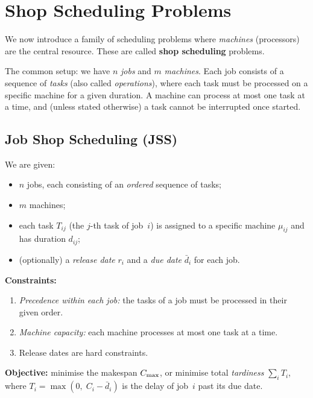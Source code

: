 \section{Shop Scheduling Problems}
\label{sec:shop-scheduling}

We now introduce a family of scheduling problems where
\emph{machines} (processors) are the central resource.
These are called \textbf{shop scheduling} problems.%

The common setup: we have $n$ \emph{jobs} and $m$
\emph{machines}.  Each job consists of a sequence of
\emph{tasks} (also called \emph{operations}), where each task
must be processed on a specific machine for a given duration.
A machine can process at most one task at a time, and
(unless stated otherwise) a task cannot be interrupted once started.

\subsection{Job Shop Scheduling (JSS)}
\label{ssec:job-shop}

\begin{definition}
\label{def:job-shop}
We are given:
\begin{itemize}[nosep]
  \item $n$ jobs, each consisting of an \emph{ordered} sequence
        of tasks;
  \item $m$ machines;
  \item each task $T_{ij}$ (the $j$-th task of job~$i$) is
        assigned to a specific machine $\mu_{ij}$ and has
        duration $d_{ij}$;
  \item (optionally) a \emph{release date} $r_i$ and a
        \emph{due date} $\bar{d}_i$ for each job.
\end{itemize}
\textbf{Constraints:}
\begin{enumerate}[nosep]
  \item \emph{Precedence within each job:} the tasks of a job
        must be processed in their given order.
  \item \emph{Machine capacity:} each machine processes at most
        one task at a time.
  \item Release dates are hard constraints.
\end{enumerate}
\textbf{Objective:} minimise the makespan $C_{\max}$, or minimise
total \emph{tardiness} $\sum_i T_i$, where
$T_i = \max(0,\; C_i - \bar{d}_i)$ is the delay of job~$i$
past its due date.
\end{definition}

